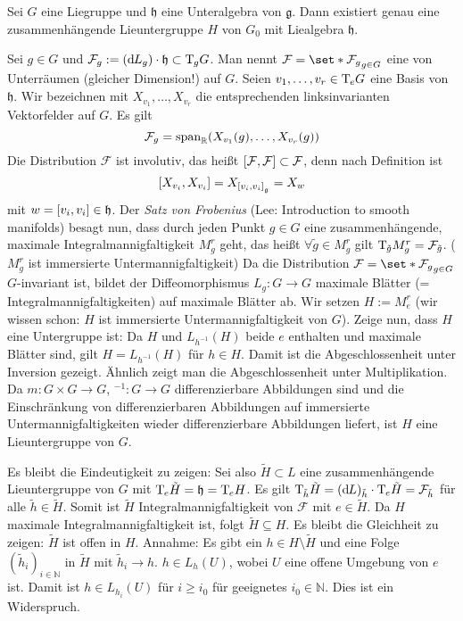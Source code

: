 \begin{satz}[label=satz:125]
	Sei $G$ eine Liegruppe und $\mathfrak{h}$ eine Unteralgebra von $\mathfrak{g}$.
	Dann existiert genau eine zusammenhängende Lieuntergruppe $H$ von $G_0$ mit Liealgebra $\mathfrak{h}$. 
\end{satz}
\begin{beweis}
	Sei $g \in G$ und $\mathcal{F}_g := (\mathd L_g) \cdot \mathfrak{h} \subset \Tmap_g G$.
	Man nennt $\mathcal{F} = \set*{\mathcal{F}_g}_{g \in G}$ eine  von Unterräumen (gleicher Dimension!) auf $G$.
	Seien $v_1, \ldots ,v_r \in \Tmap_e G$ eine Basis von $\mathfrak{h}$.
	Wir bezeichnen mit $X_{v_1}, \ldots ,X_{v_r}$ die entsprechenden linksinvarianten Vektorfelder auf $G$.
	Es gilt
	\[
		\mathcal{F}_g = \Span_\mathbb{R} \enbrace*{X_{v_1}(g), \ldots , X_{v_r}(g)}
	\]
	Die Distribution $\mathcal{F}$ ist involutiv, das heißt $\benbrace*{\mathcal{F},\mathcal{F}} \subset \mathcal{F}$, denn nach Definition ist
	\[
		\benbrace*{X_{v_i}, X_{v_i}} = X_{\benbrace*{v_i,v_i}_{\mathfrak{g}}} = X_w
	\]
	mit $w= \benbrace*{v_i,v_i} \in \mathfrak{h}$.
	Der \emph{Satz von Frobenius} (Lee: Introduction to smooth manifolds) besagt nun, dass durch jeden Punkt $g \in G$ eine zusammenhängende, maximale Integralmannigfaltigkeit $M^r_g$ geht, das heißt $\forall \tilde{g} \in M^r_g$ gilt $\Tmap_{\tilde{g}} M^r_g = \mathcal{F}_{\tilde{g}}$.
	($M^r_g$ ist immersierte Untermannigfaltigkeit)
	Da die Distribution $\mathcal{F} = \set*{\mathcal{F}_g}_{g \in G}$ $G$-invariant ist, bildet der Diffeomorphismus $L_g \colon G \to G$ maximale Blätter (= Integralmannigfaltigkeiten) auf maximale Blätter ab.
	Wir setzen $H := M^r_e$ (wir wissen schon: $H$ ist immersierte Untermannigfaltigkeit von $G$).
	Zeige nun, dass $H$ eine Untergruppe ist:
	Da $H$ und $L_{h^{-1}}(H)$ beide $e$ enthalten und maximale Blätter sind, gilt $H=L_{h^{-1}}(H)$ für $h \in H$.
	Damit ist die Abgeschlossenheit unter Inversion gezeigt.
	Ähnlich zeigt man die Abgeschlossenheit unter Multiplikation.
	Da $m \colon G  \times G \to G$, $^{-1} \colon G \to G$ differenzierbare Abbildungen sind und die Einschränkung von differenzierbaren Abbildungen auf immersierte Untermannigfaltigkeiten wieder differenzierbare Abbildungen liefert, ist $H$ eine Lieuntergruppe von $G$.
	
	Es bleibt die Eindeutigkeit zu zeigen: 
	Sei also $\tilde{H} \subset L$ eine zusammenhängende Lieuntergruppe von $G$ mit $\Tmap_e \tilde{H} = \mathfrak{h} = \Tmap_e H$.
	Es gilt $\Tmap_{\tilde{h}} \tilde{H} = (\mathd L)_{\tilde{h}} \cdot \Tmap_e \tilde{H}= \mathcal{F}_{\tilde{h}}$ für alle $\tilde{h} \in \tilde{H}$.
	Somit ist $\tilde{H}$ Integralmannigfaltigkeit von $\mathcal{F}$ mit $e \in \tilde{H}$.
	Da $H$ maximale Integralmannigfaltigkeit ist, folgt $\tilde{H} \subseteq H$.
	Es bleibt die Gleichheit zu zeigen:
	$\tilde{H}$ ist offen in $H$.
	Annahme: Es gibt ein $h \in H \setminus \tilde{H}$ und eine Folge $(\tilde{h}_i)_{i \in \mathbb{N}}$ in $\tilde{H}$ mit $\tilde{h}_i \to h$.
	$h \in L_h(U)$, wobei $U$ eine offene Umgebung von $e$ ist.
	Damit ist $h \in L_{h_i}(U)$ für $i \ge i_0$ für geeignetes $i_0 \in \mathbb{N}$.
	Dies ist ein Widerspruch.
\end{beweis}

